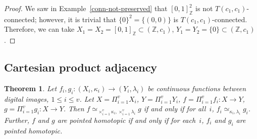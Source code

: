 \documentclass{article}
\theoremstyle{plain}
\newtheorem{thm}{Theorem}
\theoremstyle{definition}
\numberwithin{thm}{section}
\def\Z{{\mathbb Z}}
\begin{document}
\begin{proof}
We saw in Example~\ref{conn-not-preserved} that
$[0,1]_{\Z}^2$ is not $T(c_1,c_1)$-connected; however,
it is trivial that $\{0\}^2 = \{(0,0)\}$ is
$T(c_1,c_1)$-connected. Therefore, we can
take $X_1 = X_2 = [0,1]_{\Z} \subset (\Z,c_1)$,
$Y_1=Y_2=\{0\}\subset (\Z,c_1)$.
\end{proof}

\subsection{Cartesian product adjacency}
\begin{thm}
\label{Cart-prod-htpy}
Let $f_i, g_i: (X_i,\kappa_i) \to (Y_i,\lambda_i)$ be continuous functions between digital images, $1 \le i \le v$. Let $X = \Pi_{i=1}^v X_i$,
$Y  = \Pi_{i=1}^v Y_i$,
$f=\Pi_{i=1}^v f_i: X \to Y$, $g=\Pi_{i=1}^v g_i: X \to Y$.
Then $f \simeq_{\times_{i=1}^v \kappa_i, \times_{i=1}^v \lambda_i} g$ if
and only if for
all~$i$, $f_i \simeq_{\kappa_i,\lambda_i} g_i$. Further, $f$ and $g$ are pointed homotopic
if and only if for each~$i$, $f_i$ and $g_i$ are pointed homotopic.
\end{thm}
\end{document}

